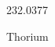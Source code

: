 \documentclass[12pt]{article}
\begin{document}
\hfill{}
\vfill
\begin{center}
  {\fontsize{50}{60}
  }

  \vspace{1em}

  232.0377

Thorium
\end{center}
\vfill
\end{document}
